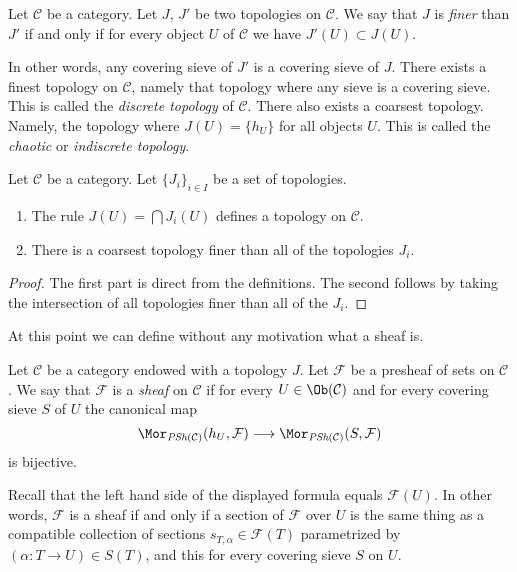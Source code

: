 \begin{definition}
\label{definition-finer}
Let $\mathcal{C}$ be a category. Let $J$, $J'$ be
two topologies on $\mathcal{C}$. We say that $J$ is
{\it finer} than $J'$ if and only if for every object
$U$ of $\mathcal{C}$ we have $J'(U) \subset J(U)$.
\end{definition}

\noindent
In other words, any covering sieve of $J'$ is a
covering sieve of $J$. There exists a finest topology
on $\mathcal{C}$, namely that topology where any sieve
is a covering sieve. This is called the
{\it discrete topology} of $\mathcal{C}$.
There also exists a coarsest topology.
Namely, the topology where $J(U) = \{h_U\}$
for all objects $U$. This is called the
{\it chaotic} or {\it indiscrete topology}.

\begin{lemma}
\label{lemma-play-with-topologies}
Let $\mathcal{C}$ be a category.
Let $\{J_i\}_{i\in I}$ be a set of topologies.
\begin{enumerate}
\item The rule $J(U) = \bigcap J_i(U)$ defines
a topology on $\mathcal{C}$.
\item There is a coarsest topology finer than
all of the topologies $J_i$.
\end{enumerate}
\end{lemma}

\begin{proof}
The first part is direct from the definitions.
The second follows by taking the intersection
of all topologies finer than all of the $J_i$.
\end{proof}

\noindent
At this point we can define
without any motivation what a sheaf is.

\begin{definition}
\label{definition-sheaf-sets-topology}
Let $\mathcal{C}$ be a category endowed with a
topology $J$. Let $\mathcal{F}$ be a presheaf of sets
on $\mathcal{C}$.
We say that $\mathcal{F}$ is a
{\it sheaf} on $\mathcal{C}$
if for every $U \in \Ob(\mathcal{C})$ and for
every covering sieve $S$ of $U$ the canonical map
$$
\Mor_{\textit{PSh}(\mathcal{C})}(h_U, \mathcal{F})
\longrightarrow
\Mor_{\textit{PSh}(\mathcal{C})}(S, \mathcal{F})
$$
is bijective.
\end{definition}

\noindent
Recall that the left hand side of the displayed
formula equals $\mathcal{F}(U)$. In other words, $\mathcal{F}$
is a sheaf if and only if a section of $\mathcal{F}$
over $U$ is the same thing as a compatible collection of sections
$s_{T, \alpha} \in \mathcal{F}(T)$ parametrized by
$(\alpha : T \to U) \in S(T)$, and this for every covering sieve $S$
on $U$.

